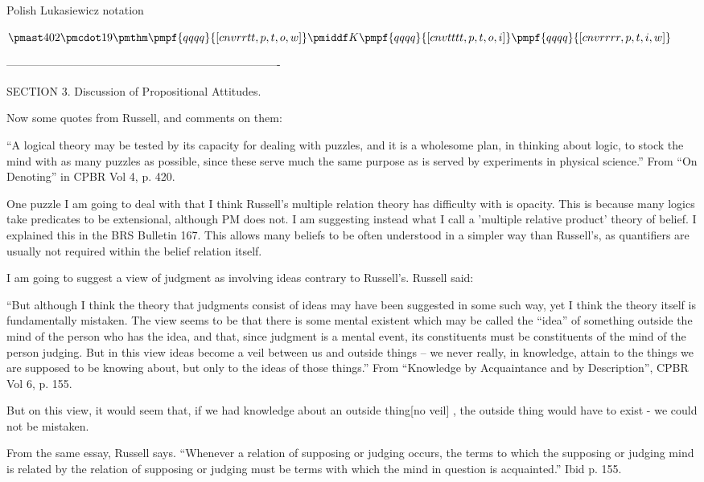 \documentclass[12pt]{article}
\begin{document}
Polish Lukasiewicz notation

$\pmast 402 \pmcdot 19 \pmthm \pmpf{qqqq}{[cnvrrtt,   p,   t,   o,   w]}   \pmiddf     K   \pmpf{qqqq}{[cnvtttt,   p,   t,   o,   i]}   \pmpf{qqqq}{[cnvrrrr,   p,   t,   i,   w]}  $


-------------------------------------------------------------------------

SECTION 3. Discussion of Propositional Attitudes.

Now some quotes from Russell, and comments on them:

“A logical theory may be tested by its capacity for dealing with puzzles, and it is a wholesome plan, in thinking about logic, to stock the mind with as many puzzles as possible, since these serve much the same purpose as is served by experiments in physical science.” From “On Denoting” in CPBR Vol 4, p. 420.

One puzzle I am going to deal with that I think Russell's multiple relation theory has difficulty with is opacity. This is because many logics take predicates to be extensional, although PM does not. I am suggesting instead what I call a 'multiple relative product' theory of belief. I explained this in the BRS Bulletin 167. This allows many beliefs to be often understood in a simpler way than Russell's, as quantifiers are usually not required within the belief relation itself. 

I am going to suggest a view of judgment as involving ideas contrary to Russell’s. Russell said:

“But although I think the theory that judgments consist of ideas may have been suggested in some such way, yet I think the theory itself is fundamentally mistaken. The view seems to be that there is some mental existent which may be called the “idea” of something outside the mind of the person who has the idea, and that, since judgment is a mental event, its constituents must be constituents of the mind of the person judging. But in this view ideas become a veil between us and outside things – we never really, in knowledge, attain to the things we are supposed to be knowing about, but only to the ideas of those things.”   From “Knowledge by Acquaintance and by Description”, CPBR Vol 6, p. 155.

But on this view, it would seem that, if we had knowledge about an outside thing[no veil] , the outside thing would have to exist - we could not be mistaken.

From the same essay, Russell says. 
“Whenever a relation of supposing or judging occurs, the terms to which the supposing or judging mind is related by the relation of supposing or judging must be terms with which the mind in question is acquainted.” Ibid p. 155.
\end{document}
